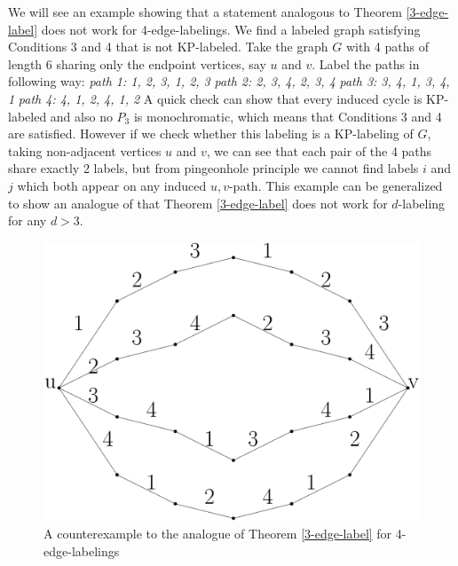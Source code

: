 \documentclass[12pt,a4paper,titlepage,openany]{report}
\begin{document}
\begin{example}
We will see an example showing that a statement analogous to Theorem \ref{3-edge-label} does not work for 4-edge-labelings. We find a labeled graph satisfying Conditions 3 and 4 that is not KP-labeled.\newline
Take the graph $G$ with 4 paths of length 6 sharing only the endpoint vertices, say $u$ and $v$. Label the paths in following way:\newline
\textit{path 1: 1, 2, 3, 1, 2, 3}\newline
\textit{path 2: 2, 3, 4, 2, 3, 4}\newline
\textit{path 3: 3, 4, 1, 3, 4, 1}\newline
\textit{path 4: 4, 1, 2, 4, 1, 2}\newline
A quick check can show that every induced cycle is KP-labeled and also no $P_3$ is monochromatic, which means that Conditions 3 and 4 are satisfied. However if we check whether this labeling is a KP-labeling of $G$, taking non-adjacent vertices $u$ and $v$, we can see that each pair of the 4 paths share exactly 2 labels, but from pingeonhole principle we cannot find labels $i$ and $j$ which both appear on any induced $u, v$-path.\newline
This example can be generalized to show an analogue of that Theorem \ref{3-edge-label} does not work for $d$-labeling for any $d>3$.  
\begin{figure}[h]
\begin{center}
\includegraphics[width=1\linewidth]{figures/d4.png}
\end{center}
\caption{A counterexample to the analogue of Theorem \ref{3-edge-label} for 4-edge-labelings}
\end{figure}
\end{example}
\end{document}
